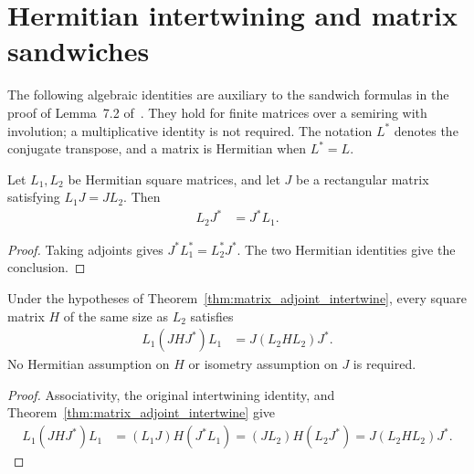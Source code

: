 \section{Hermitian intertwining and matrix sandwiches}
\label{sec:matrix_sandwich_intertwine}

The following algebraic identities are auxiliary to the sandwich formulas
in the proof of Lemma~7.2 of~\cite{OpenAI2026AreaLaw}.
They hold for finite matrices over a semiring with involution; a
multiplicative identity is not required. The notation $L^*$ denotes the
conjugate transpose, and a matrix is Hermitian when $L^*=L$.

\begin{theorem}
  \label{thm:matrix_adjoint_intertwine}
  \leanok
  Let $L_1,L_2$ be Hermitian square matrices, and let $J$ be a rectangular
  matrix satisfying $L_1J=JL_2$. Then
  \begin{align}
    L_2J^*&=J^*L_1.
  \end{align}
\end{theorem}

\begin{proof}
  \leanok
  Taking adjoints gives $J^*L_1^*=L_2^*J^*$.
  The two Hermitian identities give the conclusion.
\end{proof}

\begin{theorem}
  \label{thm:matrix_sandwich_intertwine}
  \leanok
  Under the hypotheses of Theorem~\ref{thm:matrix_adjoint_intertwine},
  every square matrix $H$ of the same size as $L_2$ satisfies
  \begin{align}
    L_1(JHJ^*)L_1&=J(L_2HL_2)J^*.
  \end{align}
  No Hermitian assumption on $H$ or isometry assumption on $J$ is required.
\end{theorem}

\begin{proof}
  \leanok
  Associativity, the original intertwining identity, and
  Theorem~\ref{thm:matrix_adjoint_intertwine} give
  \begin{align}
    L_1(JHJ^*)L_1
      &=(L_1J)H(J^*L_1)
       =(JL_2)H(L_2J^*)
       =J(L_2HL_2)J^*.
  \end{align}
\end{proof}
